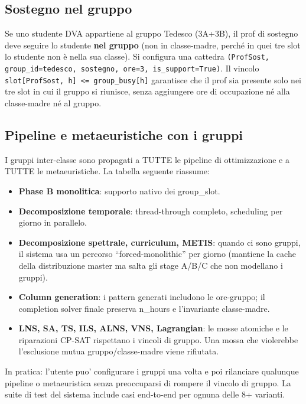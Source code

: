 \subsection{Sostegno nel gruppo}

Se uno studente DVA appartiene al gruppo Tedesco (3A+3B), il
prof di sostegno deve seguire lo studente \textbf{nel
gruppo} (non in classe-madre, perch\'e in quei tre slot lo
studente non \`e nella sua classe). Si configura una
cattedra
\texttt{(ProfSost, group\_id=tedesco, sostegno, ore=3,
is\_support=True)}. Il vincolo
\texttt{slot[ProfSost, h] <= group\_busy[h]} garantisce che
il prof sia presente solo nei tre slot in cui il gruppo si
riunisce, senza aggiungere ore di occupazione n\'e alla
classe-madre n\'e al gruppo.

\subsection{Pipeline e metaeuristiche con i gruppi}

I gruppi inter-classe sono propagati a TUTTE le pipeline di
ottimizzazione e a TUTTE le metaeuristiche. La tabella
seguente riassume:
\begin{itemize}
\item \textbf{Phase B monolitica}: supporto nativo dei
group\_slot.
\item \textbf{Decomposizione temporale}: thread-through
completo, scheduling per giorno in parallelo.
\item \textbf{Decomposizione spettrale, curriculum, METIS}:
quando ci sono gruppi, il sistema usa un percorso
``forced-monolithic'' per giorno (mantiene la cache della
distribuzione master ma salta gli stage A/B/C che non
modellano i gruppi).
\item \textbf{Column generation}: i pattern generati
includono le ore-gruppo; il completion solver finale
preserva n\_hours e l'invariante classe-madre.
\item \textbf{LNS, SA, TS, ILS, ALNS, VNS, Lagrangian}: le
mosse atomiche e le riparazioni CP-SAT rispettano i vincoli
di gruppo. Una mossa che violerebbe l'esclusione mutua
gruppo/classe-madre viene rifiutata.
\end{itemize}

In pratica: l'utente puo' configurare i gruppi una volta e
poi rilanciare qualunque pipeline o metaeuristica senza
preoccuparsi di rompere il vincolo di gruppo. La suite di
test del sistema include casi end-to-end per ognuna delle
8+ varianti.

